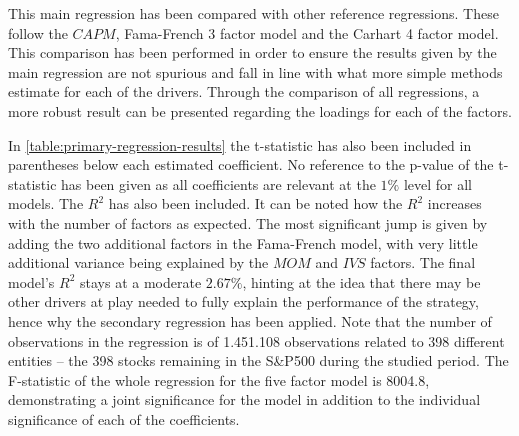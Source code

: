 This main regression has been compared with other reference regressions. These follow the $CAPM$, Fama-French 3 factor model and the Carhart 4 factor model. This comparison has been performed in order to ensure the results given by the main regression are not spurious and fall in line with what more simple methods estimate for each of the drivers. Through the comparison of all regressions, a more robust result can be presented regarding the loadings for each of the factors. 

In \autoref{table:primary-regression-results} the t-statistic has also been included in parentheses below each estimated coefficient. No reference to the p-value of the t-statistic has been given as all coefficients are relevant at the $1\%$ level for all models. The $R^2$ has also been included. It can be noted how the $R^2$ increases with the number of factors as expected. The most significant jump is given by adding the two additional factors in the Fama-French model, with very little additional variance being explained by the $MOM$ and $IVS$ factors. The final model's $R^2$ stays at a moderate $2.67\%$, hinting at the idea that there may be other drivers at play needed to fully explain the performance of the strategy, hence why the secondary regression has been applied. Note that the number of observations in the regression is of 1.451.108 observations related to 398 different entities -- the 398 stocks remaining in the S\&P500 during the studied period. The F-statistic of the whole regression for the five factor model is 8004.8, demonstrating a joint significance for the model in addition to the individual significance of each of the coefficients. 

